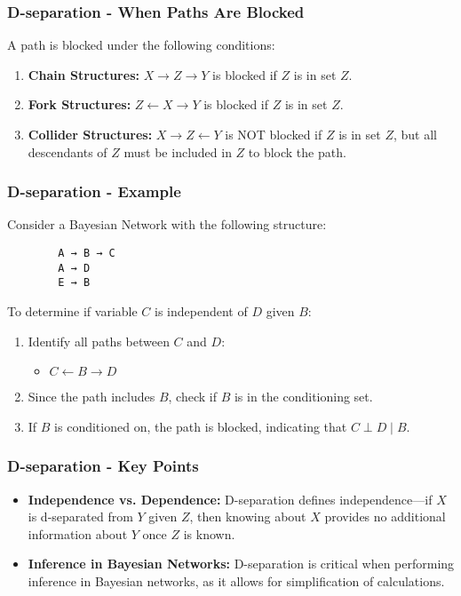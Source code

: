 \documentclass[aspectratio=169]{beamer}
\begin{document}
\begin{frame}[fragile]
    \frametitle{D-separation - When Paths Are Blocked}
    A path is blocked under the following conditions:
    \begin{enumerate}
        \item \textbf{Chain Structures:} $X \rightarrow Z \rightarrow Y$ is blocked if $Z$ is in set $Z$.
        
        \item \textbf{Fork Structures:} $Z \leftarrow X \rightarrow Y$ is blocked if $Z$ is in set $Z$.
        
        \item \textbf{Collider Structures:} $X \rightarrow Z \leftarrow Y$ is NOT blocked if $Z$ is in set $Z$, 
        but all descendants of $Z$ must be included in $Z$ to block the path.
    \end{enumerate}
\end{frame}

\begin{frame}[fragile]
    \frametitle{D-separation - Example}
    Consider a Bayesian Network with the following structure:
    \begin{center}
        \begin{verbatim}
        A → B → C
        A → D
        E → B
        \end{verbatim}
    \end{center}
    
    To determine if variable $C$ is independent of $D$ given $B$:
    \begin{enumerate}
        \item Identify all paths between $C$ and $D$: 
        \begin{itemize}
            \item $C \leftarrow B \rightarrow D$
        \end{itemize}
        \item Since the path includes $B$, check if $B$ is in the conditioning set. 
        \item If $B$ is conditioned on, the path is blocked, indicating that $C \perp D \mid B$.
    \end{enumerate}
\end{frame}

\begin{frame}[fragile]
    \frametitle{D-separation - Key Points}
    \begin{itemize}
        \item \textbf{Independence vs. Dependence:} D-separation defines independence—if 
        $X$ is d-separated from $Y$ given $Z$, then knowing about $X$ provides no 
        additional information about $Y$ once $Z$ is known.
        
        \item \textbf{Inference in Bayesian Networks:} D-separation is critical when 
        performing inference in Bayesian networks, as it allows for simplification of 
        calculations.
    \end{itemize}
\end{frame}
\end{document}
